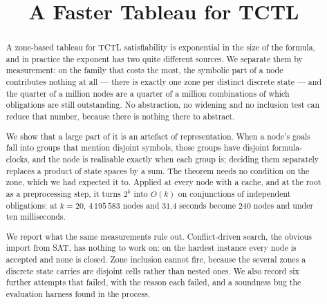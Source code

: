 \documentclass[runningheads]{llncs}
\begin{document}
\title{A Faster Tableau for TCTL}
\author{}
\institute{}
\maketitle

\begin{abstract}
A zone-based tableau for TCTL satisfiability is exponential in the size of the
formula, and in practice the exponent has two quite different sources. We
separate them by measurement: on the family that costs the most, the symbolic
part of a node contributes nothing at all --- there is exactly one zone per
distinct discrete state --- and the quarter of a million nodes are a quarter of
a million combinations of which obligations are still outstanding. No
abstraction, no widening and no inclusion test can reduce that number, because
there is nothing there to abstract.

We show that a large part of it is an artefact of representation. When a node's
goals fall into groups that mention disjoint symbols, those groups have disjoint
formula-clocks, and the node is realisable exactly when each group is; deciding
them separately replaces a product of state spaces by a sum. The theorem needs
no condition on the zone, which we had expected it to. Applied at every node
with a cache, and at the root as a preprocessing step, it turns $2^{k}$ into
$O(k)$ on conjunctions of independent obligations: at $k=20$, $4\,195\,583$
nodes and $31.4$ seconds become $240$ nodes and under ten milliseconds.

We report what the same measurements rule out. Conflict-driven search, the
obvious import from SAT, has nothing to work on: on the hardest instance every
node is accepted and none is closed. Zone inclusion cannot fire, because the
several zones a discrete state carries are disjoint cells rather than nested
ones. We also record six further attempts that failed, with the reason each
failed, and a soundness bug the evaluation harness found in the process.
\end{abstract}













\end{document}
